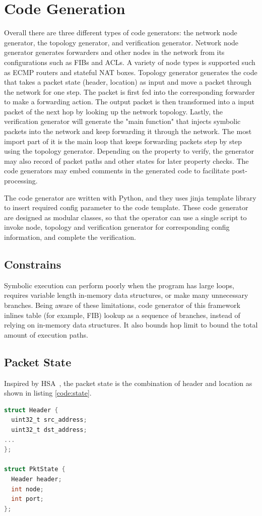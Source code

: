 \documentclass[letterpaper, 10 pt, conference]{ieeeconf}  %
\begin{document}
\section{Code Generation}\label{sec:codegen}

Overall there are three different types of code generators: the network node generator, the topology generator, and verification generator. 
Network node generator generates forwarders and other nodes in the network from its configurations such as FIBs and ACLs. 
A variety of node types is supported such as ECMP routers and stateful NAT boxes. 
Topology generator generates the code that takes a packet state (header, location) as input and move a packet through the network for one step. 
The packet is first fed into the corresponding forwarder to make a forwarding action. 
The output packet is then transformed into a input packet of the next hop by looking up the network topology. 
Lastly, the verification generator will generate the "main function" that injects symbolic packets into the network and keep forwarding it through the network. 
The most import part of it is the main loop that keeps forwarding packets step by step using the topology generator. 
Depending on the property to verify, the generator may also record of packet paths and other states for later property checks. 
The code generators may embed comments in the generated code to facilitate post-processing.

The code generator are written with Python, and they uses jinja template library to insert required config parameter to the code template. 
These code generator are designed as modular classes, so that the operator can use a single script to invoke node, topology and verification generator for corresponding config information, and complete the verification. 

\subsection{Constrains}
Symbolic execution can perform poorly when the program has large loops, requires variable length in-memory data structures, or make many unnecessary branches. 
Being aware of these limitations, code generator of this framework inlines table (for example, FIB) lookup as a sequence of branches, instead of relying on in-memory data structures. 
It also bounds hop limit to bound the total amount of execution paths. 

\subsection{Packet State}
Inspired by HSA~\cite{hsa}, the packet state is the combination of header and location as shown in listing \ref{code:state}.
\begin{lstlisting}[language=C,caption=Packet State,label=code:state,captionpos=b]
struct Header {
  uint32_t src_address;
  uint32_t dst_address;
...
};

struct PktState {
  Header header;
  int node;
  int port;
};
\end{lstlisting}
\end{document}
